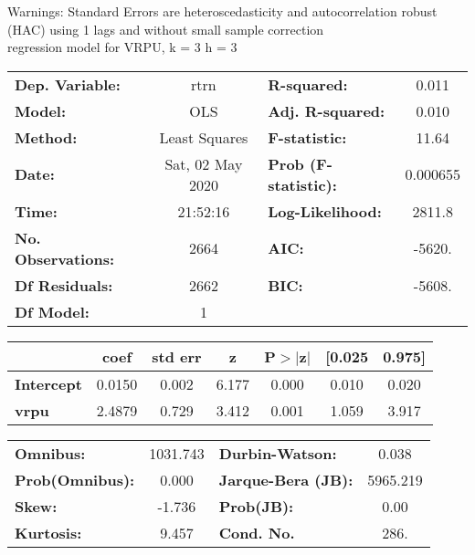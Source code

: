 Warnings: \newline
 [1] Standard Errors are heteroscedasticity and autocorrelation robust (HAC) using 1 lags and without small sample correction\\ 

regression model for VRPU, k = 3 h = 3\begin{center}
\begin{tabular}{lclc}
\toprule
\textbf{Dep. Variable:}    &       rtrn       & \textbf{  R-squared:         } &     0.011   \\
\textbf{Model:}            &       OLS        & \textbf{  Adj. R-squared:    } &     0.010   \\
\textbf{Method:}           &  Least Squares   & \textbf{  F-statistic:       } &     11.64   \\
\textbf{Date:}             & Sat, 02 May 2020 & \textbf{  Prob (F-statistic):} &  0.000655   \\
\textbf{Time:}             &     21:52:16     & \textbf{  Log-Likelihood:    } &    2811.8   \\
\textbf{No. Observations:} &        2664      & \textbf{  AIC:               } &    -5620.   \\
\textbf{Df Residuals:}     &        2662      & \textbf{  BIC:               } &    -5608.   \\
\textbf{Df Model:}         &           1      & \textbf{                     } &             \\
\bottomrule
\end{tabular}
\begin{tabular}{lcccccc}
                   & \textbf{coef} & \textbf{std err} & \textbf{z} & \textbf{P$> |$z$|$} & \textbf{[0.025} & \textbf{0.975]}  \\
\midrule
\textbf{Intercept} &       0.0150  &        0.002     &     6.177  &         0.000        &        0.010    &        0.020     \\
\textbf{vrpu}      &       2.4879  &        0.729     &     3.412  &         0.001        &        1.059    &        3.917     \\
\bottomrule
\end{tabular}
\begin{tabular}{lclc}
\textbf{Omnibus:}       & 1031.743 & \textbf{  Durbin-Watson:     } &    0.038  \\
\textbf{Prob(Omnibus):} &   0.000  & \textbf{  Jarque-Bera (JB):  } & 5965.219  \\
\textbf{Skew:}          &  -1.736  & \textbf{  Prob(JB):          } &     0.00  \\
\textbf{Kurtosis:}      &   9.457  & \textbf{  Cond. No.          } &     286.  \\
\bottomrule
\end{tabular}
\end{center}

